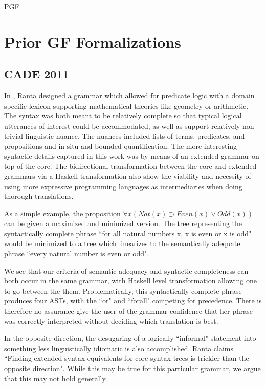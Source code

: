 PGF 
\section{Prior GF Formalizations}

\subsection{CADE 2011} \label{cade}

In \cite{rantaLog}, Ranta designed a grammar which allowed for predicate logic
with a domain specific lexicon supporting mathematical theories like geometry or
arithmetic. The syntax was both meant to be relatively complete so that typical
logical utterances of interest could be accommodated, as well as support
relatively non-trivial linguistic nuance. The nuances included lists of terms,
predicates, and propositions and in-situ and bounded quantification. The more
interesting syntactic details captured in this work was by means of an extended
grammar on top of the core. The bidirectional transformation between the core
and extended grammars via a Haskell transformation also show the viability and
necessity of using more expressive programming languages as intermediaries when
doing thorough translations.

As a simple example, the proposition $\forall x (Nat(x) \supset
Even(x) \lor Odd(x))$ can be given a maximized and minimized version. The tree
representing the syntactically complete phrase ``for all natural numbers
x, x is even or x is odd" would be minimized to a tree which linearizes to the
semantically adequate phrase ``every natural number is even or odd".

We see that our criteria of semantic adequacy and syntactic completeness can
both occur in the same grammar, with Haskell level transformation allowing one
to go between the them. Problematically, this syntactically complete phrase
produces four ASTs, with the ``or" and ``forall" competing for precedence. There
is therefore no assurance give the user of the grammar confidence that her
phrase was correctly interpreted without deciding which translation is best.

In the opposite direction, the desugaring of a logically ``informal" statement
into something less linguistically idiomatic is also accomplished. Ranta claims
``Finding extended syntax equivalents for core syntax trees is trickier than the
opposite direction". While this may be true for this particular grammar, we
argue that this may not hold generally.


